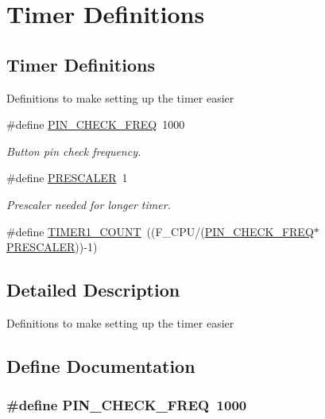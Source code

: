 \hypertarget{group__timer_defs}{\section{Timer Definitions}
\label{group__timer_defs}
}
\subsection*{Timer Definitions}
\label{_amgrp3ef478b156f2b0ca1fc5ec8cb719658d}%
 Definitions to make setting up the timer easier \begin{DoxyCompactItemize}
\item 
\#define \hyperlink{group__timer_defs_ga86d7a61fd737b39e76370528c160da17}{P\-I\-N\-\_\-\-C\-H\-E\-C\-K\-\_\-\-F\-R\-E\-Q}~1000
\begin{DoxyCompactList}\small\item\em Button pin check frequency. \end{DoxyCompactList}\item 
\#define \hyperlink{group__timer_defs_ga0fac869d83ac1a584d6c45cf609f5fe7}{P\-R\-E\-S\-C\-A\-L\-E\-R}~1
\begin{DoxyCompactList}\small\item\em Prescaler needed for longer timer. \end{DoxyCompactList}\item 
\#define \hyperlink{group__timer_defs_gafa3acf3a16f5e22815253e1cd4f25dca}{T\-I\-M\-E\-R1\-\_\-\-C\-O\-U\-N\-T}~((F\-\_\-\-C\-P\-U/(\hyperlink{group__timer_defs_ga86d7a61fd737b39e76370528c160da17}{P\-I\-N\-\_\-\-C\-H\-E\-C\-K\-\_\-\-F\-R\-E\-Q}$\ast$\hyperlink{group__timer_defs_ga0fac869d83ac1a584d6c45cf609f5fe7}{P\-R\-E\-S\-C\-A\-L\-E\-R}))-\/1)
\end{DoxyCompactItemize}


\subsection{Detailed Description}
Definitions to make setting up the timer easier 

\subsection{Define Documentation}
\hypertarget{group__timer_defs_ga86d7a61fd737b39e76370528c160da17}{
\subsubsection[{P\-I\-N\-\_\-\-C\-H\-E\-C\-K\-\_\-\-F\-R\-E\-Q}]{\setlength{\rightskip}{0pt plus 5cm}\#define {\bf P\-I\-N\-\_\-\-C\-H\-E\-C\-K\-\_\-\-F\-R\-E\-Q}~1000}}\label{group__timer_defs_ga86d7a61fd737b39e76370528c160da17}


